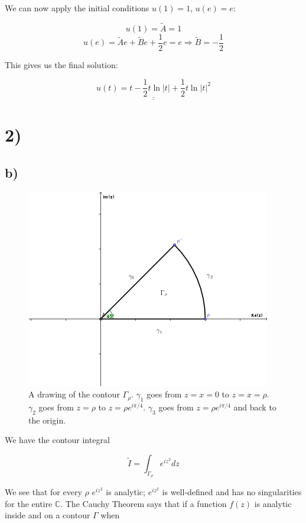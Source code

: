 \documentclass[a4paper,norsk, 10pt]{article}
\begin{document}
We can now apply the initial conditions $u(1) = 1$, $u(e) = e$:

$$
u(1) = \tilde{A} = 1 
$$
$$
u(e) = \tilde{A}e + \tilde{B}e + \frac{1}{2}e = e \Rightarrow \tilde{B} = -\frac{1}{2}
$$

This gives us the final solution:

\begin{equation}
\underline{\underline{u(t) = t -\frac{1}{2}t\ln |t| + \frac{1}{2}t\ln |t|^2}}
\end{equation}
\newpage

\section*{2)}

\subsection*{b)}
\begin{figure}[H]
\centering
\includegraphics[scale=0.8]{2b.png}
\caption{A drawing of the contour $\Gamma_{\rho}$. $\gamma_1$ goes from $z = x=0$ to $z = x = \rho$. $\gamma_2$ goes from $z = \rho$ to $z = \rho e^{i\pi/4}$. $\gamma_3$ goes from $z = \rho e^{i\pi/4}$ and back to the origin.}
\end{figure}

We have the contour integral

$$
\tilde{I} = \int_{\Gamma_{\rho}} e^{iz^2}dz
$$

We see that for every $\rho$ $e^{iz^2}$ is analytic; $e^{iz^2}$ is well-defined and has no singularities for the entire $\mathbb{C}$. The Cauchy Theorem says that if a function $f(z)$ is analytic inside and on a contour $\Gamma$ when
\end{document}
